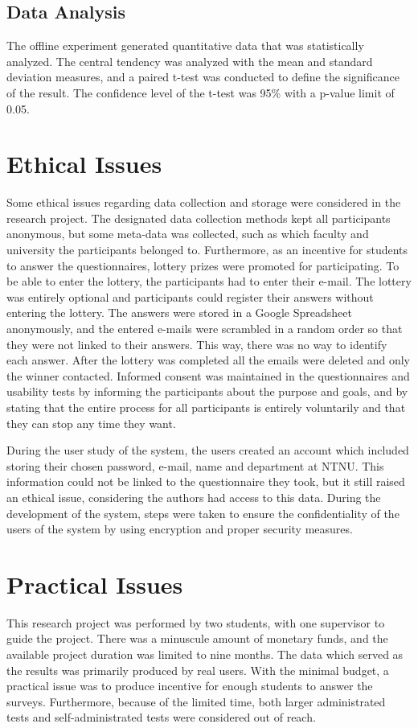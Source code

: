\subsection*{Data Analysis}
The offline experiment generated quantitative data that was statistically analyzed. The central tendency was analyzed with the mean and standard deviation measures, and a paired t-test was conducted to define the significance of the result. The confidence level of the t-test was 95\% with a p-value limit of 0.05.

\section{Ethical Issues}
Some ethical issues regarding data collection and storage were considered in the research project. The designated data collection methods kept all participants anonymous, but some meta-data was collected, such as which faculty and university the participants belonged to. Furthermore, as an incentive for students to answer the questionnaires, lottery prizes were promoted for participating. To be able to enter the lottery, the participants had to enter their e-mail. The lottery was entirely optional and participants could register their answers without entering the lottery. The answers were stored in a Google Spreadsheet anonymously, and the entered e-mails were scrambled in a random order so that they were not linked to their answers. This way, there was no way to identify each answer. After the lottery was completed all the emails were deleted and only the winner contacted. Informed consent was maintained in the questionnaires and usability tests by informing the participants about the purpose and goals, and by stating that the entire process for all participants is entirely voluntarily and that they can stop any time they want.

During the user study of the system, the users created an account which included storing their chosen password, e-mail, name and department at NTNU. This information could not be linked to the questionnaire they took, but it still raised an ethical issue, considering the authors had access to this data. During the development of the system, steps were taken to ensure the confidentiality of the users of the system by using encryption and proper security measures.


\section{Practical Issues}
This research project was performed by two students, with one supervisor to guide the project. There was a minuscule amount of monetary funds, and the available project duration was limited to nine months. The data which served as the results was primarily produced by real users. With the minimal budget, a practical issue was to produce incentive for enough students to answer the surveys. Furthermore, because of the limited time, both larger administrated tests and self-administrated tests were considered out of reach.

\cleardoublepage




